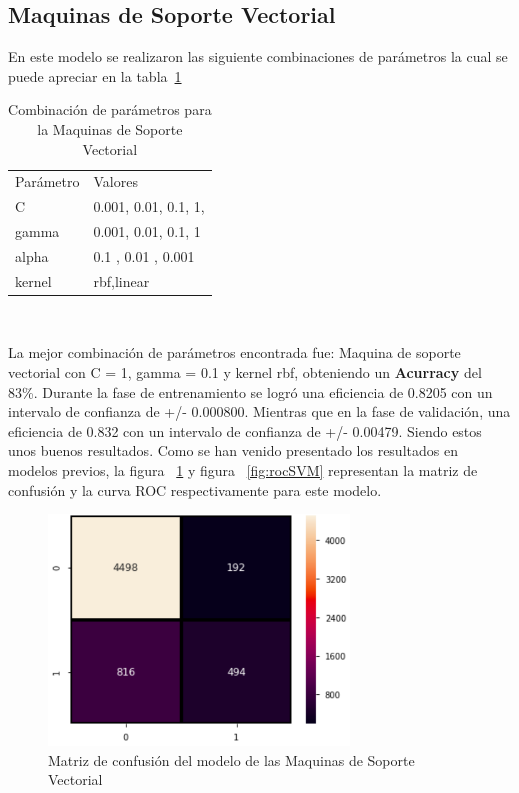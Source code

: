 \documentclass[conference]{IEEEtran}
\begin{document}
\subsection{Maquinas de Soporte Vectorial}\hfill
En este modelo se realizaron las siguiente combinaciones de parámetros la cual se puede apreciar en la tabla~\ref{tab:parametrosSVM} \hfill\\
\begin{table}[H]
\centering
\begin{tabular}{|l|l|}
\hline
Parámetro    & Valores          \\ 
C & 0.001, 0.01, 0.1, 1,        \\ 
gamma    & 0.001, 0.01, 0.1, 1  \\ 
alpha    &  0.1  , 0.01 , 0.001  \\ 
kernel    & rbf,linear   \\ \hline
\end{tabular}\hfill
\caption{Combinación de parámetros para la Maquinas de Soporte Vectorial}
\label{tab:parametrosSVM}\hfill\\
\end{table} 
La mejor combinación de parámetros encontrada fue: Maquina de soporte vectorial con C = 1, gamma = 0.1 y kernel rbf, obteniendo un \textbf{Acurracy} del 83\%.
Durante la fase de entrenamiento se logró una eficiencia de 0.8205 con un intervalo de confianza de +/- 0.000800. Mientras que en la fase de validación, una eficiencia de 0.832  con un intervalo de confianza de +/-  0.00479. Siendo estos unos buenos resultados.
Como se han venido presentado los resultados en modelos previos, la figura ~\ref{fig:matrixSVM}  y figura ~\ref{fig:rocSVM} representan la matriz de confusión y la curva ROC respectivamente para este modelo.
\begin{center}
    \begin{figure}[H]
        \hfill
     \centerline{\includegraphics[width=8cm]{MatrixSVM.png}}
    \caption{Matriz de confusión del modelo de las Maquinas de Soporte Vectorial}
    \label{fig:matrixSVM}
    \end{figure}  
\end{center}
\end{document}
